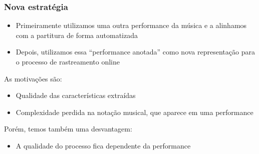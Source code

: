 \documentclass[serif,mathserif]{beamer}
\begin{document}
\begin{frame}
  \frametitle{Nova estratégia}
  \begin{itemize}
    \item Primeiramente utilizamos uma outra performance da música e a alinhamos com a partitura de forma automatizada\\\pause
    \item Depois, utilizamos essa ``performance anotada'' como nova representação para o processo de rastreamento online\pause
  \end{itemize}



  As motivações são:\pause
  \begin{itemize}
    \item Qualidade das características extraídas\\\pause %
    \item Complexidade perdida na notação musical, que aparece em uma performance\pause %
  \end{itemize}
  Porém, temos também uma desvantagem:\pause
  \begin{itemize}
    \item A qualidade do processo fica dependente da performance\\
  \end{itemize}
\end{frame}
\end{document}
